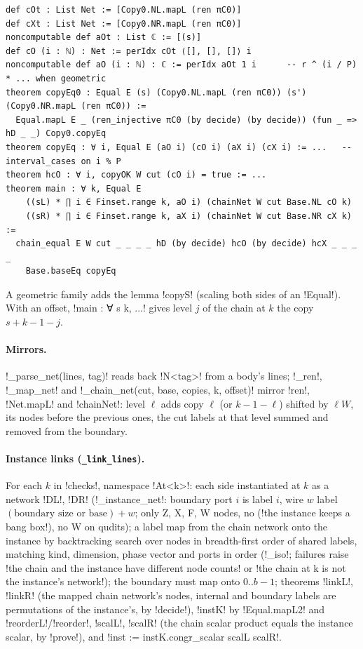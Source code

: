 {{{\begin{lstlisting}[style=lexlean]
def cOt : List Net := [Copy0.NL.mapL (ren πC0)]
def cXt : List Net := [Copy0.NR.mapL (ren πC0)]
noncomputable def aOt : List ℂ := [(s)]
def cO (i : ℕ) : Net := perIdx cOt ⟨[], [], []⟩ i
noncomputable def aO (i : ℕ) : ℂ := perIdx aOt 1 i      -- r ^ (i / P) * ... when geometric
theorem copyEq0 : Equal E (s) (Copy0.NL.mapL (ren πC0)) (s') (Copy0.NR.mapL (ren πC0)) :=
  Equal.mapL E _ (ren_injective πC0 (by decide) (by decide)) (fun _ => hD _ _) Copy0.copyEq
theorem copyEq : ∀ i, Equal E (aO i) (cO i) (aX i) (cX i) := ...   -- interval_cases on i % P
theorem hcO : ∀ i, copyOK W cut (cO i) = true := ...
theorem main : ∀ k, Equal E
    ((sL) * ∏ i ∈ Finset.range k, aO i) (chainNet W cut Base.NL cO k)
    ((sR) * ∏ i ∈ Finset.range k, aX i) (chainNet W cut Base.NR cX k) :=
  chain_equal E W cut _ _ _ _ hD (by decide) hcO (by decide) hcX _ _ _ _
    Base.baseEq copyEq
\end{lstlisting}
A geometric family adds the lemma \lexlean!copyS! (scaling both sides of an \lexlean!Equal!). With an
offset, \lexlean!main : ∀ s k, ...! gives level $j$ of the chain at $k$ the copy $s+k-1-j$.

\paragraph{Mirrors.} \lexpy!_parse_net(lines, tag)! reads back \lexlean!N<tag>! from a body's lines;
\lexpy!_ren!, \lexpy!_map_net! and \lexpy!_chain_net(cut, base, copies, k, offset)! mirror \lexlean!ren!,
\lexlean!Net.mapL! and \lexlean!chainNet!: level $\ell$ adds copy $\ell$ (or $k-1-\ell$) shifted by
$\ell W$, its nodes before the previous ones, the cut labels at that level summed and removed from
the boundary.

\paragraph{Instance links (\texttt{\_link\_lines}).} For each $k$ in \lexcode!checks!, namespace
\lexlean!At<k>!: each side instantiated at $k$ as a network \lexlean!DL!, \lexlean!DR!
(\lexpy!_instance_net!: boundary port $i$ is label $i$, wire $w$ label $(\text{boundary size or base}) +
w$; only Z, X, F, W nodes, no \bboxes (\lexcode!the instance keeps a bang box!), no W on qudits); a
label map from the chain network onto the instance by backtracking search over nodes in
breadth-first order of shared labels, matching kind, dimension, phase vector and ports in order
(\lexpy!_iso!; failures raise \lexcode!the chain and the instance have different node counts! or
\lexcode!the chain at k is not the instance's network!); the boundary must map onto
$0..b-1$; theorems \lexlean!linkL!, \lexlean!linkR! (the mapped chain network's nodes, internal and
boundary labels are permutations of the instance's, by \lexlean!decide!), \lexlean!instK! by
\lexlean!Equal.mapL2! and \lexlean!reorderL!/\lexlean!reorder!, \lexlean!scalL!, \lexlean!scalR! (the chain
scalar product equals the instance scalar, by \lexpy!prove!), and
\lexlean!inst := instK.congr_scalar scalL scalR!.

}}}
